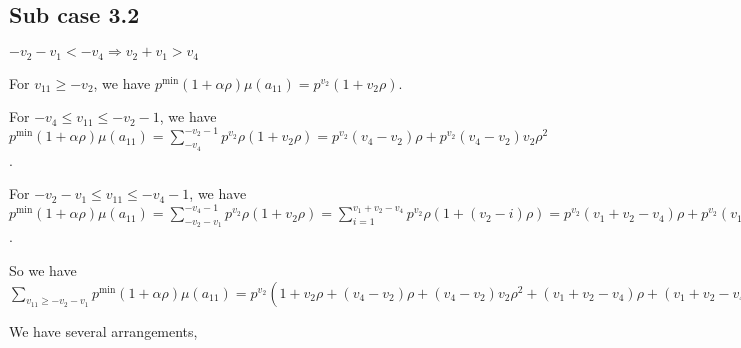 \documentclass{article}
\begin{document}
\subsection{Sub case 3.2}
$-v_2-v_1<{-v_4}\Rightarrow{v_2+v_1>{v_4}}$

For $v_{11}\geq{-v_2}$, we have $p^{\min}(1+\alpha\rho)\mu(a_{11})=p^{v_2}(1+v_2\rho)$.

For $-v_4\leq{v_{11}}\leq{-v_2-1}$, we have $p^{\min}(1+\alpha\rho)\mu(a_{11})=\sum_{-v_4}^{-v_2-1}p^{v_2}\rho(1+v_2\rho)=p^{v_2}(v_4-v_2)\rho+p^{v_2}(v_4-v_2)v_2\rho^2$.

For $-v_2-v_1\leq{v_{11}}\leq{-v_4-1}$, we have $p^{\min}(1+\alpha\rho)\mu(a_{11})=\sum_{-v_2-v_1}^{-v_4-1}p^{v_2}\rho(1+v_2\rho)=\sum_{i=1}^{v_1+v_2-v_
4}p^{v_2}\rho(1+(v_2-i)\rho)=p^{v_2}(v_1+v_2-v_4)\rho+p^{v_2}(v_1+v_2-v_4)v_2\rho^2-p^{v_2}\binom{v_1+v_2-v_4+1}{2}\rho^2$.

So we have $\sum_{v_{11}\geq{-v_2-v_1}}p^{\min}(1+\alpha\rho)\mu(a_{11})=p^{v_2}(1+v_2\rho+(v_4-v_2)\rho+(v_4-v_2)v_2\rho^2+(v_1+v_2-v_4)\rho+(v_1+v_2-v_4)v_2\rho^2-\frac{(v_1+v_2-v_4+1)(v_1+v_2-v_4)}{2}\rho^2)=p^{v_2}(1+v_1\rho+v_2\rho+v_1v_2\rho^2-\frac{v_1^2}{2}\rho^2-v_2v_1\rho^2+v_4v_1\rho^2-\frac{v_2^2}{2}\rho^2+v_4v_2\rho^2-\frac{v_4^2}{2}\rho^2-\frac{v_1}{2}\rho^2-\frac{v_2}{2}\rho^2+\frac{v_4}{2}\rho^2)$

We have several arrangements,
\end{document}
